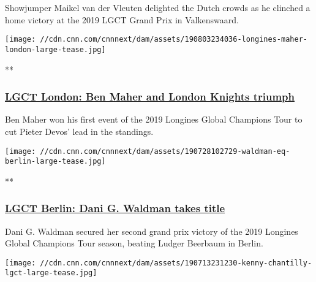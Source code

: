 Showjumper Maikel van der Vleuten delighted the Dutch crowds as he
clinched a home victory at the 2019 LGCT Grand Prix in Valkenswaard.

\href{/videos/sports/2019/08/05/london-longines-global-champions-tour-review-gcl-ben-maher-cnneq-vision-spt-intl.cnn}{}

\texttt{[image: //cdn.cnn.com/cnnnext/dam/assets/190803234036-longines-maher-london-large-tease.jpg]}

**

\hypertarget{lgct-london-ben-maher-and-london-knights-triumph}{%
\subsubsection{\texorpdfstring{\href{/videos/sports/2019/08/05/london-longines-global-champions-tour-review-gcl-ben-maher-cnneq-vision-spt-intl.cnn}{LGCT
London: Ben Maher and London Knights
triumph}}{LGCT London: Ben Maher and London Knights triumph}}\label{lgct-london-ben-maher-and-london-knights-triumph}}

Ben Maher won his first event of the 2019 Longines Global Champions Tour
to cut Pieter Devos' lead in the standings.

\href{/videos/sports/2019/07/29/berlin-longines-global-champions-tour-gcl-dani-waldman-hamburg-giants-cnneq-vision-spt-intl.cnn}{}

\texttt{[image: //cdn.cnn.com/cnnnext/dam/assets/190728102729-waldman-eq-berlin-large-tease.jpg]}

**

\hypertarget{lgct-berlin-dani-g-waldman-takes-title}{%
\subsubsection{\texorpdfstring{\href{/videos/sports/2019/07/29/berlin-longines-global-champions-tour-gcl-dani-waldman-hamburg-giants-cnneq-vision-spt-intl.cnn}{LGCT
Berlin: Dani G. Waldman takes
title}}{LGCT Berlin: Dani G. Waldman takes title}}\label{lgct-berlin-dani-g-waldman-takes-title}}

Dani G. Waldman secured her second grand prix victory of the 2019
Longines Global Champions Tour season, beating Ludger Beerbaum in
Berlin.

\href{/videos/sports/2019/07/15/darragh-kenny-lgct-chantilly-review-gcl-2019-cnneq-vision-spt-intl.cnn}{}

\texttt{[image: //cdn.cnn.com/cnnnext/dam/assets/190713231230-kenny-chantilly-lgct-large-tease.jpg]}

